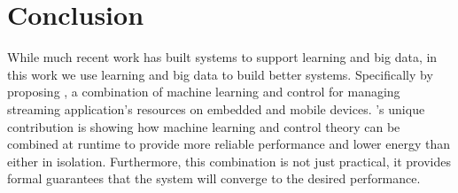 \section{Conclusion}
While much recent work has built systems to support learning and big
data, in this work we use learning and big data to build better
systems.  Specifically by proposing \SYSTEM{}, a combination of
machine learning and control for managing streaming application's
resources on embedded and mobile devices.  \SYSTEM{}'s unique
contribution is showing how machine learning and control theory can be
combined at runtime to provide more reliable performance and lower
energy than either in isolation.  Furthermore, this combination is not
just practical, it provides formal guarantees that the system will
converge to the desired performance.
